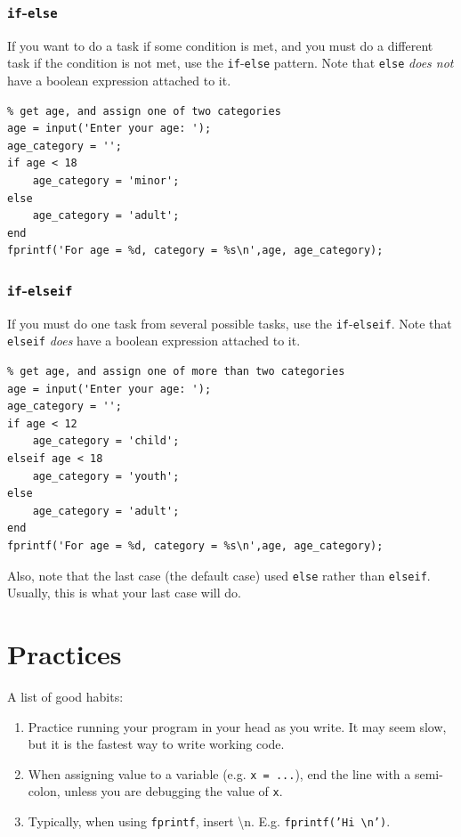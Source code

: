 \documentclass{report}
\newcommand{\code}[1]{\texttt{#1}}
\begin{document}
\subsection{\code{if}-\code{else}}
If you want to do a task if some condition is met, and you must do a different task if the condition is not met, use the \code{if}-\code{else} pattern.  Note that \code{else} {\em does not} have a boolean expression attached to it. 
\begin{lstlisting}
% get age, and assign one of two categories
age = input('Enter your age: ');
age_category = '';
if age < 18
    age_category = 'minor';
else
    age_category = 'adult';
end
fprintf('For age = %d, category = %s\n',age, age_category);
\end{lstlisting}

\subsection{\code{if}-\code{elseif}}
If you must do one task from several possible tasks, use the \code{if}-\code{elseif}. Note that \code{elseif} {\em does } have a boolean expression attached to it. 
\begin{lstlisting}
% get age, and assign one of more than two categories
age = input('Enter your age: ');
age_category = '';
if age < 12
    age_category = 'child';
elseif age < 18
    age_category = 'youth';
else 
    age_category = 'adult';
end
fprintf('For age = %d, category = %s\n',age, age_category);
\end{lstlisting}
Also, note that the last case (the default case) used \code{else} rather than \code{elseif}. Usually, this is what your last case will do.

\chapter{Practices}

A list of good habits:
\begin{enumerate}
	\item{Practice running your program in your head as you write. It may seem slow, but it is the fastest way to write working code. }
	\item{When assigning value to a variable (e.g. \code{x = ...}), end the line with a semi-colon, unless you are debugging the value of \code{x}. }
	\item{Typically, when using \code{fprintf}, insert \textbackslash n. E.g. \code{fprintf('Hi  \textbackslash n')}}. 
\end{enumerate}
\end{document}
